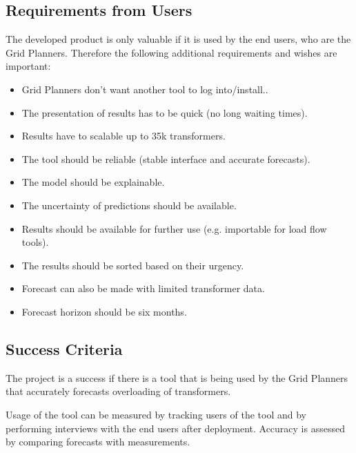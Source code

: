 \documentclass[letterpaper,10pt,english]{sphinxmanual}
\begin{document}
\subsection{Requirements from Users}
\label{\detokenize{business_understanding:requirements-from-users}}
The developed product is only valuable if it is used by the end users, who are the Grid Planners.
Therefore the following additional requirements and wishes are important:
\begin{itemize}
\item {} 
Grid Planners don’t want another tool to log into/install..

\item {} 
The presentation of results has to be quick (no long waiting times).

\item {} 
Results have to scalable up to 35k transformers.

\item {} 
The tool should be reliable (stable interface and accurate forecasts).

\item {} 
The model should be explainable.

\item {} 
The uncertainty of predictions should be available.

\item {} 
Results should be available for further use (e.g. importable for load flow tools).

\item {} 
The results should be sorted based on their urgency.

\item {} 
Forecast can also be made with limited transformer data.

\item {} 
Forecast horizon should be six months.

\end{itemize}


\subsection{Success Criteria}
\label{\detokenize{business_understanding:success-criteria}}
The project is a success if there is a tool that is being used by the Grid Planners that accurately forecasts overloading of transformers.

Usage of the tool can be measured by tracking users of the tool and by performing interviews with the end users after deployment.
Accuracy is assessed by comparing forecasts with measurements.
\end{document}

